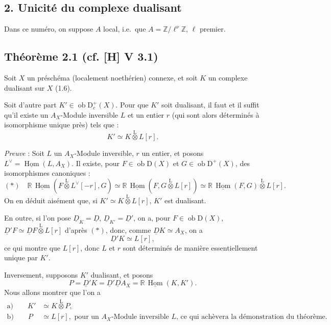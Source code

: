\documentclass[11pt]{article}
\DeclareMathOperator{\Hom}{Hom}
\newcommand{\R}{\mathbb{R}}\newcommand{\RHomCore}{\mathbb{R}\mathrm{Hom}}
\newcommand{\D}{\mathrm{D}}
\newcommand{\Z}{\mathbb{Z}}
\newcommand{\ob}{\operatorname{ob}}
\providecommand{\Hom}{\operatorname{Hom}}
\providecommand{\ob}{\operatorname{ob}}
\providecommand{\R}{\mathrm R}
\providecommand{\Z}{\mathbb Z}
\providecommand{\Hom}{\operatorname{Hom}}
\begin{document}
\subsection*{2. Unicité du complexe dualisant}

Dans ce numéro, on suppose $A$ local, i.e.~que $A = \Z/\ell^{\nu}\Z$, $\ell$ premier.

\subsection*{Théorème 2.1 (cf. [H] V 3.1)}
Soit $X$ un préschéma (localement noethérien) connexe, et soit $K$ un complexe dualisant sur $X$ (1.6).

Soit d'autre part $K' \in \ob \D_c^{+}(X)$. Pour que $K'$ soit dualisant, il faut et il suffit qu'il existe un $A_X$-Module inversible $L$ et un entier $r$ (qui sont 
alors
déterminés à isomorphisme unique près) tels que :
\[
K' \simeq K \mathop{\otimes}\limits^{\mathrm{L}} L[r].
\]

\emph{Preuve} : Soit $L$ un $A_X$-Module inversible, $r$ un entier, et posons $L^{\vee} = \underline{\Hom}(L, A_X)$. Il existe, pour $F \in \ob \D(X)$ et $G \in \ob \D^{+}(X)$, des isomorphismes canoniques :
\[
(*) \quad \R\,\underline{\Hom}(F \mathop{\otimes}\limits^{\mathrm{L}} L^{\vee}[-r], G) \simeq \R\,\underline{\Hom}(F, G \mathop{\otimes}\limits^{\mathrm{L}} L[r]) \simeq \R\,\underline{\Hom}(F,G) \mathop{\otimes}\limits^{\mathrm{L}} L[r].
\]
On en déduit aisément que, si $K' \simeq K \mathop{\otimes}\limits^{\mathrm{L}} L[r]$, $K'$ est dualisant.

En outre, si l'on pose $\underline{D}_K = \underline{D}$, $\underline{D}_{K'} = \underline{D}'$, on a, pour $F \in \ob \D(X)$, $\underline{D}'F \simeq \underline{D} F \mathop{\otimes}\limits^{\mathrm{L}} L[r]$ d'après $(*)$, donc, comme $\underline{D} K \simeq A_X$, on a
\[
\underline{D}' K \simeq L[r],
\]
ce qui montre que $L[r]$, donc $L$ et $r$ sont déterminés de manière essentiellement unique par $K'$.

Inversement, supposons $K'$ dualisant, et posons
\[
P = \underline{D}'K = \underline{D}'\underline{D} A_X = \R\,\underline{\Hom}(K,K').
\]
Nous allons montrer que l'on a
\begin{align*}
\text{a)} \qquad K' &\simeq K \mathop{\otimes}\limits^{\mathrm{L}} P, \\
\text{b)} \qquad P &\simeq L[r], \text{ pour un $A_X$-Module inversible $L$, ce qui achèvera la démonstration du théorème.}
\end{align*}
\end{document}
